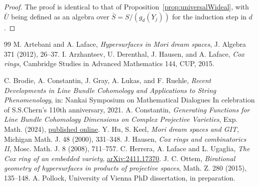 \documentclass[a4paper,11pt]{amsart}
\theoremstyle{plain}
\theoremstyle{definition}
\begin{document}
\begin{proof}
    The proof is identical to that of Proposition~\ref{prop:universalWideal}, with $\bar U$ being defined as an algebra over $\bar S = S/(g_d(Y_j))$ for the induction step in $d$.
\end{proof}

\begin{thebibliography}{99}
 M. Artebani and A. Laface, {\em Hypersurfaces in Mori dream spaces}, J. Algebra 371 (2012), 26--37.
 I. Arzhantsev, U. Derenthal, J. Hausen, and A. Laface, {\em Cox rings}, Cambridge Studies in Advanced Mathematics 144, CUP, 2015.

 C. Brodie, A. Constantin, J. Gray, A. Lukas, and F. Ruehle, {\em Recent Developments in Line Bundle Cohomology and Applications to String Phenomenology}, in: Nankai Symposium on Mathematical
Dialogues In celebration of S.S.Chern’s 110th anniversary, 2021.
 A. Constantin, {\em Generating Functions for Line Bundle Cohomology Dimensions on Complex Projective Varieties}, Exp. Math. (2024), \href{https://doi.org/10.1080/10586458.2024.2380794}{published online}.
 Y. Hu, S. Keel, {\em Mori dream spaces and GIT}, Michigan Math. J. 48 (2000), 331--348.
 J. Hausen, {\em Cox rings and combinatorics II}, Mosc. Math. J. 8 (2008), 711--757.
 C. Herrera, A. Laface and L. Ugaglia, {\em The Cox ring of an embedded variety}, \href{https://arxiv.org/abs/2411.17370}{arXiv:2411.17370}.
 J. C. Ottem, {\em Birational geometry of hypersurfaces in products of projective spaces}, Math. Z. 280 (2015), 135--148.
 A. Pollock, University of Vienna PhD dissertation, in preparation. 

\end{thebibliography}
\end{document}
